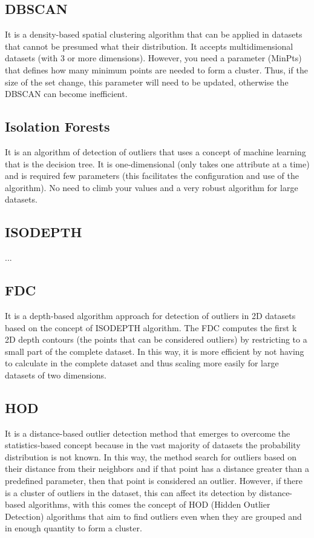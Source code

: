 \subsection{DBSCAN}

It is a density-based spatial clustering algorithm that can be applied in datasets that
cannot be presumed what their distribution. It accepts multidimensional datasets (with
3 or more dimensions). However, you need a parameter (MinPts) that defines how many
minimum points are needed to form a cluster. Thus, if the size of the set change, this
parameter will need to be updated, otherwise the DBSCAN can become inefficient.

\subsection{Isolation Forests}

It is an algorithm of detection of outliers that uses a concept of machine learning that
is the decision tree. It is one-dimensional (only takes one attribute at a time) and is
required few parameters (this facilitates the configuration and use of the algorithm).
No need to climb your values and a very robust algorithm for large datasets.

\subsection{ISODEPTH}

...

\subsection{FDC}

It is a depth-based algorithm approach for detection of outliers in 2D datasets based on
the concept of ISODEPTH algorithm. The FDC computes the first k 2D depth contours (the
points that can be considered outliers) by restricting to a small part of the complete 
dataset. In this way, it is more efficient by not having to calculate in the complete 
dataset and thus scaling more easily for large datasets of two dimensions.

\subsection{HOD}

It is a distance-based outlier detection method that emerges to overcome the statistics-based
concept because in the vast majority of datasets the probability distribution is not known.
In this way, the method search for outliers based on their distance from their neighbors
and if that point has a distance greater than a predefined parameter, then that point is
considered an outlier. However, if there is a cluster of outliers in the dataset, this 
can affect its detection by distance-based algorithms, with this comes the concept of HOD
(Hidden Outlier Detection) algorithms that aim to find outliers even when they are grouped
and in enough quantity to form a cluster.

